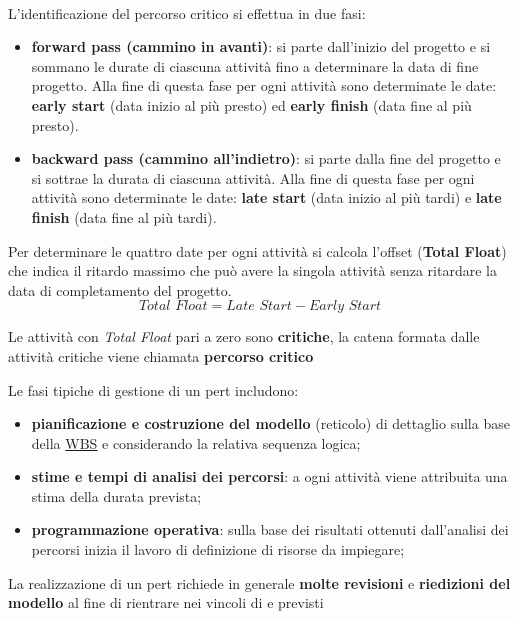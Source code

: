 \\
L'identificazione del percorso critico si effettua in due fasi:
\begin{itemize}
    \item \textbf{forward pass (cammino in avanti)}: si parte dall'inizio del progetto e si sommano le durate di ciascuna attività fino a determinare la data di fine progetto.
        Alla fine di questa fase per ogni attività sono determinate le date: \textbf{early start} (data inizio al più presto) ed \textbf{early finish} (data fine al più presto).
    \item \textbf{backward pass (cammino all'indietro)}: si parte dalla fine del progetto e si sottrae la durata di ciascuna attività.
        Alla fine di questa fase per ogni attività sono determinate le date: \textbf{late start} (data inizio al più tardi) e \textbf{late finish} (data fine al più tardi).
\end{itemize}
Per determinare le quattro date per ogni attività si calcola l'offset (\textbf{Total Float}) che indica il ritardo massimo che può avere la singola attività senza ritardare la data di completamento del progetto.
\[
    \textit{Total Float} = \textit{Late Start} - \textit{Early Start}
\]
\begin{note}
    Le attività con \textit{Total Float} pari a zero sono \textbf{critiche}, la catena formata dalle attività critiche viene chiamata \textbf{percorso critico}
\end{note}
Le fasi tipiche di gestione di un \ac{pert} includono:
\begin{itemize}
    \item \textbf{pianificazione e costruzione del modello} (reticolo) di dettaglio sulla base della \hyperref[sub:ftt_wbs]{WBS} e considerando la relativa sequenza logica;
    \item \textbf{stime e tempi di analisi dei percorsi}: a ogni attività viene attribuita una stima della durata prevista;
    \item \textbf{programmazione operativa}: sulla base dei risultati ottenuti dall'analisi dei percorsi inizia il lavoro di definizione di risorse da impiegare;
\end{itemize}
\begin{note}
    La realizzazione di un \ac{pert} richiede in generale \textbf{molte revisioni} e \textbf{riedizioni del modello} al fine di rientrare nei vincoli di  e  previsti
\end{note}
%
